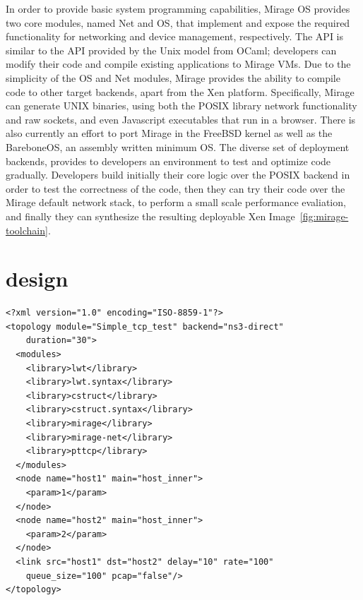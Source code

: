 In order to provide basic system programming capabilities, Mirage OS provides
two core modules, named Net and OS, that implement and expose the required
functionality for networking and device management, respectively. The API is
similar to the API provided by the Unix model from OCaml; developers can modify
their code and compile existing applications to Mirage VMs. Due to the
simplicity of the OS and Net modules, Mirage provides the ability to compile
code to other target backends, apart from the Xen platform. Specifically, Mirage 
can generate UNIX binaries, using both the POSIX library network functionality 
and raw sockets, and even Javascript executables that run in a browser. There is
also currently an effort to port Mirage in the FreeBSD kernel as well as the
BareboneOS, an assembly written minimum OS. The diverse set
of deployment backends, provides to developers an environment to
test and optimize code gradually. Developers build initially their core logic over
the POSIX backend in order to test the correctness of the code, then they can
try their code over the Mirage default network stack, to perform a small scale
performance evaliation, and finally they can synthesize the resulting deployable 
Xen Image~\ref{fig:mirage-toolchain}.

\section{\sdnsim design} \label{sec:sdnsim-design}

\lstset{language=XML,
numberstyle=\footnotesize,
basicstyle=\ttfamily\footnotesize,
captionpos=b,
}
\begin{lstlisting}[caption={A sample \sdnsim configuration file interconnecting
  a server and a client host},label={lst:sdnsim-conf}]
<?xml version="1.0" encoding="ISO-8859-1"?>
<topology module="Simple_tcp_test" backend="ns3-direct" 
    duration="30">
  <modules>
    <library>lwt</library>
    <library>lwt.syntax</library>
    <library>cstruct</library>
    <library>cstruct.syntax</library>
    <library>mirage</library>
    <library>mirage-net</library>
    <library>pttcp</library>
  </modules>
  <node name="host1" main="host_inner"> 
    <param>1</param>
  </node>
  <node name="host2" main="host_inner"> 
    <param>2</param>
  </node>
  <link src="host1" dst="host2" delay="10" rate="100" 
    queue_size="100" pcap="false"/>
</topology>
\end{lstlisting}

